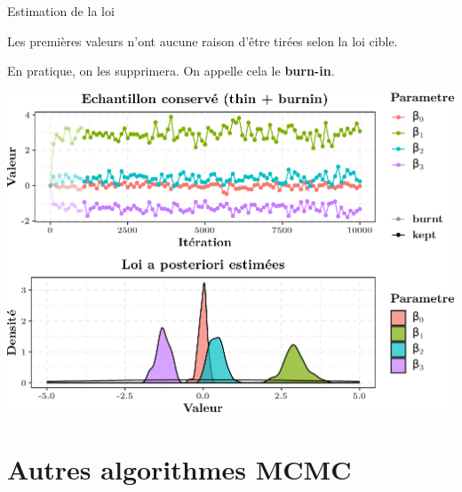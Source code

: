 \documentclass[9pt,ignorenonframetext,]{beamer}
\begin{document}
\begin{frame}{Estimation de la loi}
\protect\hypertarget{estimation-de-la-loi}{}

Les premières valeurs n'ont aucune raison d'être tirées selon la loi
cible.

En pratique, on les supprimera. On appelle cela le
\textbf{burn-in}.\pause

\includegraphics{diapos_mcmc_files/figure-beamer/plot_burned_thin-1.pdf}

\end{frame}

\hypertarget{autres-algorithmes-mcmc}{%
\section{Autres algorithmes MCMC}\label{autres-algorithmes-mcmc}}
\end{document}
